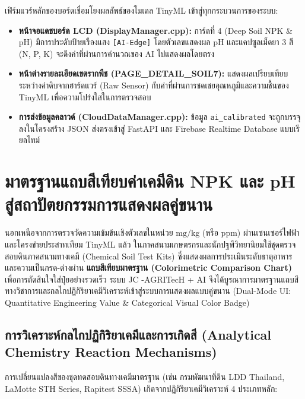 เฟิร์มแวร์หลักของบอร์ดเชื่อมโยงผลลัพธ์ของโมเดล TinyML เข้าสู่ทุกกระบวนการของระบบ:
\begin{itemize}
    \item \textbf{หน้าจอแดชบอร์ด LCD (DisplayManager.cpp):} การ์ดที่ 4 (Deep Soil NPK \& pH) มีการประดับป้ายเรืองแสง \texttt{[AI-Edge]} โดยตัวเลขแสดงผล pH และแคปซูลเม็ดยา 3 สี (N, P, K) จะดึงค่าที่ผ่านการคำนวณของ AI ไปแสดงผลโดยตรง
    \item \textbf{หน้าต่างรายละเอียดเขตรากพืช (PAGE\_DETAIL\_SOIL7):} แสดงผลเปรียบเทียบระหว่างค่าดิบจากฮาร์ดแวร์ (Raw Sensor) กับค่าที่ผ่านการชดเชยอุณหภูมิและความชื้นของ TinyML เพื่อความโปร่งใสในการตรวจสอบ
    \item \textbf{การส่งข้อมูลคลาวด์ (CloudDataManager.cpp):} ข้อมูล \texttt{ai\_calibrated} จะถูกบรรจุลงในโครงสร้าง JSON ส่งตรงเข้าสู่ FastAPI และ Firebase Realtime Database แบบเรียลไทม์
\end{itemize}

\section{มาตรฐานแถบสีเทียบค่าเคมีดิน NPK และ pH สู่สถาปัตยกรรมการแสดงผลคู่ขนาน}
\label{sec:soil_colorimetric_standards}

นอกเหนือจากการตรวจวัดความเข้มข้นเชิงตัวเลขในหน่วย $\text{mg/kg}$ (หรือ ppm) ผ่านเซนเซอร์ไฟฟ้าและโครงข่ายประสาทเทียม TinyML แล้ว ในภาคสนามเกษตรกรและนักปฐพีวิทยานิยมใช้ชุดตรวจสอบดินภาคสนามทางเคมี (Chemical Soil Test Kits) ซึ่งแสดงผลการประเมินระดับธาตุอาหารและความเป็นกรด-ด่างผ่าน \textbf{แถบสีเทียบมาตรฐาน (Colorimetric Comparison Chart)} เพื่อการตัดสินใจใส่ปุ๋ยอย่างรวดเร็ว ระบบ JC -AGRITecH + AI จึงได้บูรณาการมาตรฐานแถบสีทางวิชาการและกลไกปฏิกิริยาเคมีวิเคราะห์เข้าสู่ระบบการแสดงผลแบบคู่ขนาน (Dual-Mode UI: Quantitative Engineering Value \& Categorical Visual Color Badge)

\subsection{การวิเคราะห์กลไกปฏิกิริยาเคมีและการเกิดสี (Analytical Chemistry Reaction Mechanisms)}

การเปลี่ยนแปลงสีของชุดทดสอบดินทางเคมีมาตรฐาน (เช่น กรมพัฒนาที่ดิน LDD Thailand, LaMotte STH Series, Rapitest SSSA) เกิดจากปฏิกิริยาเคมีวิเคราะห์ 4 ประเภทหลัก:

